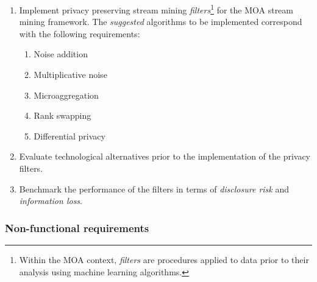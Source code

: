 \begin{enumerate}[leftmargin=1.5cm, label=\textbf{R\arabic*}]
	\item
	Implement privacy preserving stream mining \textit{filters}\footnote{Within the MOA context, \textit{filters} are procedures applied to data prior to their analysis using machine learning algorithms.} for the MOA stream mining framework. The \textit{suggested} algorithms to be implemented correspond with the following requirements:
	\begin{enumerate}[label*=\textbf{-\arabic*}]
		\item Noise addition~\citep[p.~54]{Hundepool:StatisticalDisclosureControl}
		\item Multiplicative noise~\citep[p.~57]{Hundepool:StatisticalDisclosureControl}
		\item Microaggregation~\citep[p.~60]{Hundepool:StatisticalDisclosureControl}
		\item Rank swapping~\citep[p.~73]{Hundepool:StatisticalDisclosureControl}
		\item Differential privacy~\citep{Dwork:DifferentialPrivacy}
	\end{enumerate}
	
	\item
	Evaluate technological alternatives prior to the implementation of the privacy filters.
	
	\item
	Benchmark the performance of the filters in terms of \textit{disclosure risk} and \textit{information loss}.
\end{enumerate}

\subsubsection*{Non-functional requirements}

